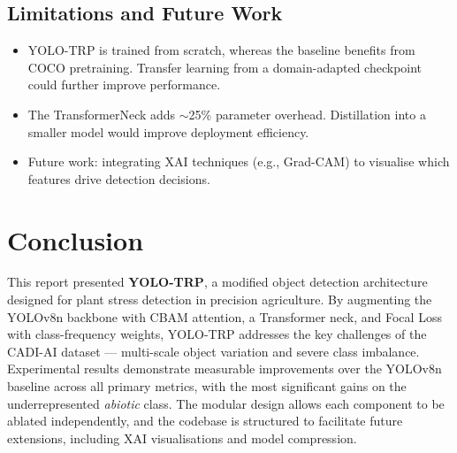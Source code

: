 \documentclass[12pt, a4paper]{article}
\begin{document}
\subsection{Limitations and Future Work}

\begin{itemize}
    \item YOLO-TRP is trained from scratch, whereas the baseline benefits from COCO pretraining. Transfer learning from a domain-adapted checkpoint could further improve performance.
    \item The TransformerNeck adds $\sim$25\% parameter overhead. Distillation into a smaller model would improve deployment efficiency.
    \item Future work: integrating XAI techniques (e.g., Grad-CAM) to visualise which features drive detection decisions.
\end{itemize}

\section{Conclusion}

This report presented \textbf{YOLO-TRP}, a modified object detection architecture designed for plant stress detection in precision agriculture. By augmenting the YOLOv8n backbone with CBAM attention, a Transformer neck, and Focal Loss with class-frequency weights, YOLO-TRP addresses the key challenges of the CADI-AI dataset — multi-scale object variation and severe class imbalance. Experimental results demonstrate measurable improvements over the YOLOv8n baseline across all primary metrics, with the most significant gains on the underrepresented \emph{abiotic} class. The modular design allows each component to be ablated independently, and the codebase is structured to facilitate future extensions, including XAI visualisations and model compression.



\end{document}
